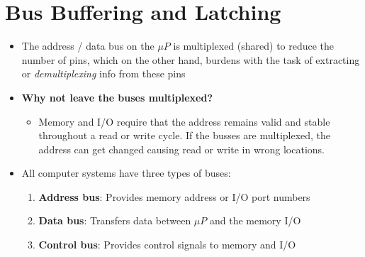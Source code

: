 \section{Bus Buffering and Latching}
\begin{itemize}
  \item The address / data bus on the $\mu P$ is multiplexed (shared) to reduce the number of pins, which on the other hand, burdens with the task of extracting or \textit{demultiplexing} info from these pins
  \item \textbf{Why not leave the buses multiplexed?}
  \begin{itemize}
    \item Memory and I/O require that the address remains valid and stable throughout a read or write cycle. If the busses are multiplexed, the address can get changed causing read or write in wrong locations.
  \end{itemize}

  \item All computer systems have three types of buses:
  \begin{enumerate}
    \item \textbf{Address bus}: Provides memory address or I/O port numbers
    \item \textbf{Data bus}: Transfers data between $\mu P$ and the memory I/O
    \item \textbf{Control bus}: Provides control signals to memory and I/O
  \end{enumerate}
\end{itemize}
